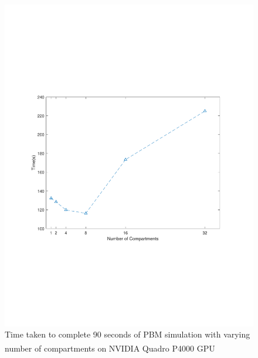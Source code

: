 \documentclass[review]{elsarticle}
\begin{document}
\begin{linenumbers}
\begin{figure}[H]
\centering
\includegraphics[scale=0.7,trim=50 180 50 180, clip]{Figure_4.pdf}
\caption{Time taken to complete 90 seconds of PBM simulation with varying number of compartments 
on NVIDIA\textsuperscript{\tiny\textregistered} Quadro P4000 GPU}
\label{fig:res_gpu_timings}
\end{figure}



\end{linenumbers}
\end{document}
